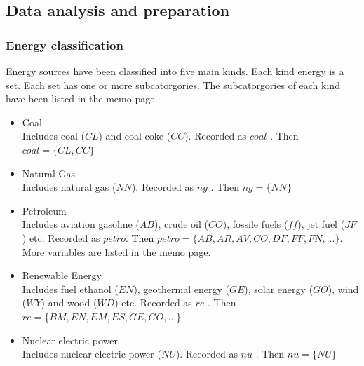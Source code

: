 \documentclass{mcmthesis}
\begin{document}
\subsection{Data analysis and preparation}

\subsubsection{Energy classification}
Energy sources have been classified into five main kinds. Each kind energy is a set. Each set has one or more subcatorgories. The subcatorgories of each kind
have been listed in the memo page.%
\begin{itemize}
    \item Coal\\
    Includes coal ($CL$) and coal coke ($CC$). Recorded as $coal$ . Then $coal = \{CL, CC\}$
    \item Natural Gas\\
    Includes natural gas ($NN$). Recorded as $ng$ . Then $ng = \{NN\}$
    \item Petroleum\\
    Includes aviation gasoline ($AB$), crude oil ($CO$), fossile fuels ($ff$), jet fuel ($JF$) etc.
    Recorded as $petro$. Then $petro = \{AB, AR, AV, CO, DF, FF, FN, ... \}$. More variables are listed in the memo page.
    \item Renewable Energy\\
    Includes fuel ethanol ($EN$), geothermal energy ($GE$), solar energy ($GO$), wind ($WY$) and wood ($WD$) etc.
    Recorded as $re$ . Then $re = \{BM, EN, EM, ES, GE, GO, ... \}$
    \item Nuclear electric power\\
    Includes nuclear electric power ($NU$). Recorded as $nu$ . Then $nu = \{NU\}$
\end{itemize}
\end{document}
